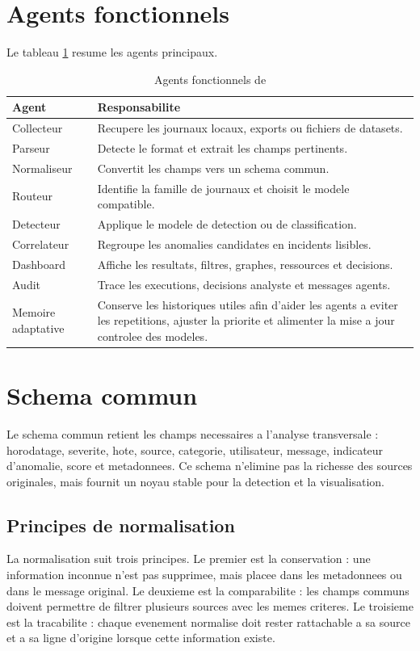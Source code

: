 \section{Agents fonctionnels}
Le tableau \ref{tab:agents} resume les agents principaux.

\begin{table}[H]
\centering
\caption{Agents fonctionnels de \logminer}
\label{tab:agents}
\begin{tabularx}{\textwidth}{p{3cm}X}
\toprule
\textbf{Agent} & \textbf{Responsabilite} \\
\midrule
Collecteur & Recupere les journaux locaux, exports ou fichiers de datasets. \\
Parseur & Detecte le format et extrait les champs pertinents. \\
Normaliseur & Convertit les champs vers un schema commun. \\
Routeur & Identifie la famille de journaux et choisit le modele compatible. \\
Detecteur & Applique le modele de detection ou de classification. \\
Correlateur & Regroupe les anomalies candidates en incidents lisibles. \\
Dashboard & Affiche les resultats, filtres, graphes, ressources et decisions. \\
Audit & Trace les executions, decisions analyste et messages agents. \\
Memoire adaptative & Conserve les historiques utiles afin d'aider les agents a eviter les repetitions, ajuster la priorite et alimenter la mise a jour controlee des modeles. \\
\bottomrule
\end{tabularx}
\end{table}

\section{Schema commun}
Le schema commun retient les champs necessaires a l'analyse transversale : horodatage, severite, hote, source, categorie, utilisateur, message, indicateur d'anomalie, score et metadonnees. Ce schema n'elimine pas la richesse des sources originales, mais fournit un noyau stable pour la detection et la visualisation.

\subsection{Principes de normalisation}
La normalisation suit trois principes. Le premier est la conservation : une information inconnue n'est pas supprimee, mais placee dans les metadonnees ou dans le message original. Le deuxieme est la comparabilite : les champs communs doivent permettre de filtrer plusieurs sources avec les memes criteres. Le troisieme est la tracabilite : chaque evenement normalise doit rester rattachable a sa source et a sa ligne d'origine lorsque cette information existe.

